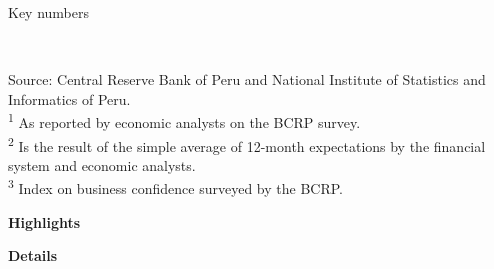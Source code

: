 \documentclass[final,a4paper]{report}
\begin{document}
\begin{vwcol}[widths={0.45,0.55},
 sep=0.5cm, justify=flush,rule=0pt,indent=0em]
	\begin{minipage}{0.43\textwidth} \vspace{0cm}
		
		\hspace{0cm} \large \textcolor{red1}{Key numbers} \normalcolor \normalfont
		\vspace{0.2cm}
		
		\small
		\color{black!100}
		{\renewcommand{\arraystretch}{1.4}
			\hspace{0cm} \begin{tabular}[c]{p{4.5cm} c c }
				\\
			\end{tabular}
		}
		\\
		\color{blackdark} Source: Central Reserve Bank of Peru and National Institute of Statistics and Informatics of Peru. \\
		\color{blackdark} \textsuperscript{1} As reported by economic analysts on the BCRP survey. \\
		\color{blackdark} \textsuperscript{2} Is the result of the simple average of 12-month expectations by the financial system and economic analysts. \\
		\color{blackdark} \textsuperscript{3} Index on business confidence surveyed by the BCRP.	

		\vspace{-1.5cm}	
		\tableofcontents
	\end{minipage}
	
\begin{minipage}{0.50\textwidth} 
\vspace{0cm}
{\textcolor{red1} {\bfseries {\Large }}}
\bigbreak
\bfseries \textcolor{red1}{\large Highlights}
\begin{itemize}
\normalsize{}
\end{itemize}
\bfseries \textcolor{red1}{\large Details}\\
\\
\normalfont \normalsize{}
\end{minipage}
\end{vwcol}
	
\thispagestyle{firststyle}

	\newpage
	
\thispagestyle{main}
\end{document}
